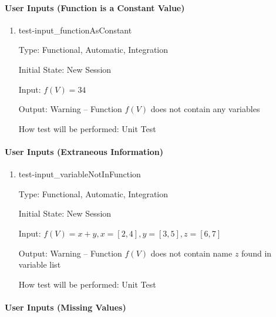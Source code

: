 \documentclass[12pt, titlepage]{article}
\begin{document}
\paragraph{User Inputs (Function is a Constant Value)}

\begin{enumerate}	
	\item{test-input\_functionAsConstant}
	
	Type: Functional, Automatic, Integration
	
	Initial State: New Session
	
	Input: $f(V) = 34$
	
	Output: Warning -- Function $f(V)$ does not contain any variables
	
	How test will be performed: Unit Test\\
\end{enumerate}
	
\paragraph{User Inputs (Extraneous Information)}
	
\begin{enumerate}
	\item{test-input\_variableNotInFunction}
	
	Type: Functional, Automatic, Integration
	
	Initial State: New Session
	
	Input: $f(V) = x + y, x = [2,4], y = [3,5], z = [6,7]$
	
	Output: Warning -- Function $f(V)$ does not contain name $z$ found in 
	variable list
	
	How test will be performed: Unit Test\\
	
\end{enumerate}
		
\paragraph{User Inputs (Missing Values)}
\end{document}
